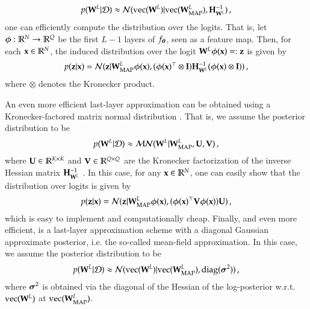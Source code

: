 %
\begin{equation}
    p({\mathbf{W}}^L | \mathcal{D}) \approx \mathcal{N}(\text{vec}({\mathbf{W}}^L) | \text{vec}({\mathbf{W}}^L_\text{MAP}), {\mathbf{H}}_{{\mathbf{W}}^L}^{-1}) \, ,
\end{equation}
%
one can efficiently compute the distribution over the logits. That is, let $\boldsymbol{\phi}: \mathbb{R}^N \to \mathbb{R}^{Q}$ be the first $L-1$ layers of $f_{\boldsymbol{\theta}}$, seen as a feature map. Then, for each $\mathbf{x} \in \mathbb{R}^N$, the induced distribution over the logit ${\mathbf{W}}^L \boldsymbol{\phi}(\mathbf{x}) =: \mathbf{z}$ is given by
%
\begin{equation}
    p(\mathbf{z} | \mathbf{x}) = \mathcal{N}(\mathbf{z} | {\mathbf{W}}^L_\text{MAP} \boldsymbol{\phi}(\mathbf{x}), (\boldsymbol{\phi}(\mathbf{x})^\top \otimes {\mathbf{I}}) {\mathbf{H}}_{{\mathbf{W}}^L}^{-1} (\boldsymbol{\phi}(\mathbf{x}) \otimes {\mathbf{I}})) \, ,
\end{equation}
%
where $\otimes$ denotes the Kronecker product.

An even more efficient last-layer approximation can be obtained using a Kronecker-factored matrix normal distribution \citep{louizos_structured_2016,sun_learning_2017,ritter2018a}. That is, we assume the posterior distribution to be
%
\begin{equation}
    p({\mathbf{W}}^L | \mathcal{D}) \approx \mathcal{MN}({\mathbf{W}}^L | {\mathbf{W}}^L_\text{MAP}, {\mathbf{U}}, {\mathbf{V}}) \, ,
\end{equation}
%
where ${\mathbf{U}} \in \mathbb{R}^{K \times K}$ and ${\mathbf{V}} \in \mathbb{R}^{Q \times Q}$ are the Kronecker factorization of the inverse Hessian matrix ${\mathbf{H}}_{{\mathbf{W}}^L}^{-1}$ \citep{martens2015optimizing}. In this case, for any $\mathbf{x} \in \mathbb{R}^N$, one can easily show that the distribution over logits is given by
%
\begin{equation}
    p(\mathbf{z} | \mathbf{x}) = \mathcal{N}(\mathbf{z} | {\mathbf{W}}^L_\text{MAP} \boldsymbol{\phi}(\mathbf{x}), (\boldsymbol{\phi}(\mathbf{x})^\top {\mathbf{V}} \boldsymbol{\phi}(\mathbf{x})){\mathbf{U}}) \, ,
\end{equation}
%
which is easy to implement and computationally cheap. Finally, and even more efficient, is a last-layer approximation scheme with a diagonal Gaussian approximate posterior, i.e. the so-called mean-field approximation. In this case, we assume the posterior distribution to be
%
\begin{equation}
    p({\mathbf{W}}^L | \mathcal{D}) \approx \mathcal{N}(\text{vec}({\mathbf{W}}^L) | \text{vec}({\mathbf{W}}^L_\text{MAP}), \text{diag}(\boldsymbol{\sigma}^2)) \, ,
\end{equation}
%
where $\boldsymbol{\sigma}^2$ is obtained via the diagonal of the Hessian of the log-posterior w.r.t. $\text{vec}({\mathbf{W}}^L)$ at $\text{vec}({\mathbf{W}}^L_\text{MAP})$.

